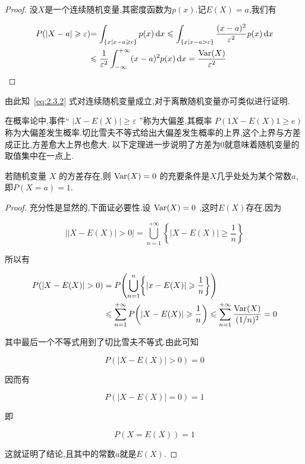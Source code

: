 \begin{proof}
	没$ X $是一个连续随机变量,其密度函数为$ p(x) $.记$ E(X)=a $,我们有
	
	\begin{align*}
	{P(|X-a| \geqslant \varepsilon)} & {=\int_{\{x | x-a \geq \epsilon\}} p(x) \dd  x \leq \int_{\{x | x-a>c\}} \frac{(x-a)^{2}}{\varepsilon^{2}} p(x) \dd  x} \\
	{} & {\leqslant \frac{1}{\varepsilon^{2}} \int_{-\infty}^{+\infty}(x-a)^{2} p(x) \dd  x=\frac{\Var (X)}{\varepsilon^{2}}}
	\end{align*}
\end{proof}

由此知~\ref{eq:2.3.2} 式对连续随机变量成立,对于离散随机变量亦可类似进行证明.

在概率论中,事件“ $|X-E(X)| \geqslant \varepsilon$ ”称为大偏差,其概率 $ P(1X-E(X)1 \geqslant e) $ 称为大偏差发生概率.切比雪夫不等式给出大偏差发生概率的上界,这个上界与方差成正比,方差愈大上界也愈大.
以下定理进一步说明了方差为0就意味着随机变量的取值集中在一点上.

\begin{theorem}{}{}
	若随机变量 $X$ 的方差存在,则 $\operatorname{Var} (X)=0$ 的充要条件是$ X $几乎处处为某个常数$ a $,即$ P(X=a)=1 $.
\end{theorem}

\begin{proof}
	充分性是显然的,下面证必要性.设 $\operatorname{Var} (X)=0$ ,这时$ E(X) $存在.因为
	
	\[
	| | X-E(X)|>0|=\bigcup_{n=1}^{+\infty}\left\{|X-E(X)| \geqslant \frac{1}{n}\right\}
	\]
	
	所以有
	
	\[
	\begin{aligned} P(|X-E(X)|>0) &=P\left(\bigcup_{n=1}^{n}\left\{|x-E(X)| \geqslant \frac{1}{n}\right\}\right) \\ & \leqslant \sum_{n=1}^{+\infty} P\left(|X-E(X)| \geqslant \frac{1}{n}\right) \leqslant \sum_{n=1}^{+\infty} \frac{\Var (X)}{(1 / n)^{2}}=0 \end{aligned}
	\]
	
	其中最后一个不等式用到了切比雪夫不等式.由此可知
	
	\[
	P(|X-E(X)|>0)=0
	\]
	
	因而有
	
	\[
	P(|X-E(X)|=0)=1
	\]
	
	即
	
	\[
	P(X=E(X))=1
	\]
	
	这就证明了结论,且其中的常数$ a $就是$ E(X) $.
\end{proof}

